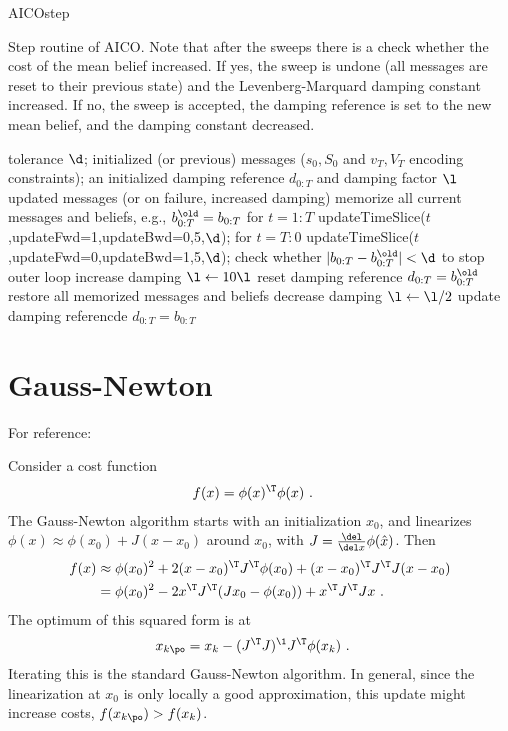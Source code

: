 \begin{algorithm}
\caption{AICOstep\label{algAICO}}
\small

Step routine of AICO. Note that after the sweeps there is a check
whether the cost of the mean belief increased. If yes, the sweep is
undone (all messages are reset to their previous state) and the
Levenberg-Marquard damping constant increased. If no, the sweep is
accepted, the damping reference is set to the new mean belief, and the
damping constant decreased.

\medskip

\begin{algorithmic}[1]\small
\REQUIRE tolerance $\d$; initialized (or previous) messages ($s_0,S_0$
and $v_T,V_T$ encoding constraints); an initialized damping reference
$d_{0:T}$ and damping factor $\l$
\ENSURE updated messages (or on failure, increased damping)
\STATE memorize all current messages and beliefs, e.g., $b^\old_{0:T}=b_{0:T}$
\STATE for $t=1:T$ updateTimeSlice($t$,updateFwd=1,updateBwd=0,5,$\d$);
\STATE for $t=T:0$ updateTimeSlice($t$,updateFwd=0,updateBwd=1,5,$\d$);
\STATE check whether $|b_{0:T} - b^\old_{0:T}|<\d$ to stop outer loop
\STATE increase damping $\l \gets 10 \l$
\STATE reset damping reference $d_{0:T} = b_{0:T}^\old$
\STATE restore all memorized messages and beliefs
\ELSE
\STATE decrease damping $\l \gets  \l/2$
\STATE update damping referencde $d_{0:T} = b_{0:T}$
\ENDIF
\end{algorithmic}
\end{algorithm}



\section{Gauss-Newton}

For reference:

Consider a cost function
\begin{align}
f(x)
 &= \phi(x)^\T \phi(x) ~.
\end{align}
The Gauss-Newton algorithm starts with an initialization $x_0$,
and linearizes $\phi(x) \approx \phi(x_0) + J (x-x_0)$ around $x_0$, with
$J=\frac{\del}{\del x}\phi(\hat x)$. Then
\begin{align}
f(x)
 &\approx
  \phi(x_0)^2 + 2 (x-x_0)^\T J^\T \phi(x_0) + (x-x_0)^\T J^\T J (x-x_0) \\
 &=
  \phi(x_0)^2 - 2 x^\T J^\T (J x_0 - \phi(x_0)) + x^\T J^\T J x ~.
\end{align}
The optimum of this squared form is at
\begin{align}
x_{k\po} &=  x_k - (J^\T J)^\1 J^\T \phi(x_k) ~.
\end{align}
Iterating this is the standard Gauss-Newton algorithm. In general,
since the linearization at $x_0$ is only locally a good approximation,
this update might increase costs, $f(x_{k\po}) > f(x_k)$.

